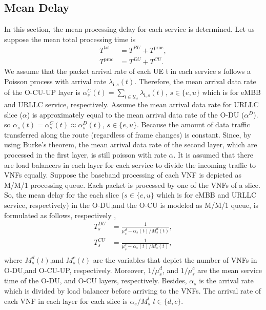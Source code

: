 \documentclass[conference]{IEEEtran}
\begin{document}
\subsection{Mean Delay}
In this section, the mean processing delay for each service is determined.
Let us suppose the mean total processing time is
\begin{subequations} 
\begin{alignat}{4}
T^{\text{tot}} &= T^{RU} + T^{\text{proc}},\\
T^{\text{proc}} &= T^{DU} + T^{CU}.
\end{alignat}
\end{subequations} 
We assume that the packet arrival rate of each UE $\mathfrak{i}$ in each service s follows a Poisson process with arrival rate $\lambda_{\mathfrak{i},s}(t)$.
Therefore, the mean arrival data rate of the O-CU-UP layer is $\alpha^C_{s}(t) = \sum_{\mathfrak{i}\in \mathcal{U}_s}\lambda_{\mathfrak{i},s}(t)$, $s \in \{e,u\}$ which is for eMBB and URLLC service, respectively.
Assume the mean arrival data rate for URLLC slice ($\alpha$) is approximately equal to the mean arrival data rate of the O-DU ($\alpha^D$). so $\alpha_s(t) = \alpha^C_{s}(t) \approx \alpha^D_s(t)$, $s \in \{e,u\}$.
Because the amount of data traffic transferred along the route (regardless of frame changes) is constant.
Since, by using Burke’s theorem, the mean arrival data rate of the second layer, which are processed in the first layer, is still poisson with rate $\alpha$.
It is assumed that there are load balancers in each layer for each service to divide the incoming traffic to VNFs equally. %
Suppose the baseband processing of each VNF is depicted as M/M/1 processing queue.
Each packet is processed by one of the VNFs of a slice. So, the mean delay for the each slice ($s \in \{e,u\}$ which is for eMBB and URLLC service, respectively) in the O-DU,and the O-CU is modeled as M/M/1 queue, is formulated as follows, respectively \cite{SystemCostMinimization,luong2018joint,luong2018novel},
\begin{equation}
\begin{split}
T^{DU}_s &= \frac{1}{\mu^d_s - \alpha_s(t)/{M^{d}_s(t)}},\\
T^{CU}_s &= \frac{1}{\mu^c_s - \alpha_s(t)/{M^{c}_s}(t)},\\
\end{split}
\end{equation}
where $M^{d}_s(t)$,and $M^{c}_s(t)$ are the variables that depict the number of VNFs in O-DU,and O-CU-UP, respectively. 
Moreover, $1/\mu^d_s$, and $1/\mu^c_s$ are the mean service time of the O-DU, and O-CU layers, respectively.
Besides, $\alpha_s$ is the  arrival rate which is divided
by load balancer before arriving to the VNFs. The arrival rate of each VNF in each layer for each slice is $\alpha_s/{M^{l}_s}$ $ l \in \{d,c\}$.
\end{document}
